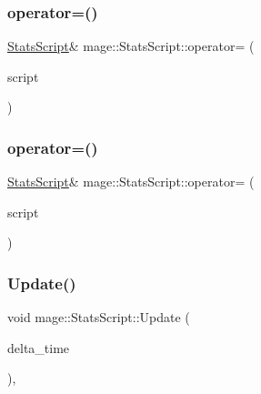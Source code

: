 \hypertarget{classmage_1_1_stats_script_a7da39f1c0cc417dabdc539f49deec7c3}{}\label{classmage_1_1_stats_script_a7da39f1c0cc417dabdc539f49deec7c3} 
\subsubsection{\texorpdfstring{operator=()}{operator=()}\hspace{0.1cm}{\footnotesize\ttfamily [1/2]}}
{\footnotesize\ttfamily \hyperlink{classmage_1_1_stats_script}{Stats\+Script}\& mage\+::\+Stats\+Script\+::operator= (\begin{DoxyParamCaption}\item[{const \hyperlink{classmage_1_1_stats_script}{Stats\+Script} \&}]{script }\end{DoxyParamCaption})\hspace{0.3cm}{\ttfamily [delete]}}

\hypertarget{classmage_1_1_stats_script_a6adacd651debb83254e1121f32c8f21e}{}\label{classmage_1_1_stats_script_a6adacd651debb83254e1121f32c8f21e} 
\subsubsection{\texorpdfstring{operator=()}{operator=()}\hspace{0.1cm}{\footnotesize\ttfamily [2/2]}}
{\footnotesize\ttfamily \hyperlink{classmage_1_1_stats_script}{Stats\+Script}\& mage\+::\+Stats\+Script\+::operator= (\begin{DoxyParamCaption}\item[{\hyperlink{classmage_1_1_stats_script}{Stats\+Script} \&\&}]{script }\end{DoxyParamCaption})\hspace{0.3cm}{\ttfamily [delete]}}

\hypertarget{classmage_1_1_stats_script_abb2f4de15b51b72e54dc893ecd947fad}{}\label{classmage_1_1_stats_script_abb2f4de15b51b72e54dc893ecd947fad} 
\subsubsection{\texorpdfstring{Update()}{Update()}}
{\footnotesize\ttfamily void mage\+::\+Stats\+Script\+::\+Update (\begin{DoxyParamCaption}\item[{double}]{delta\+\_\+time }\end{DoxyParamCaption})\hspace{0.3cm}{\ttfamily [override]}, {\ttfamily [virtual]}}


